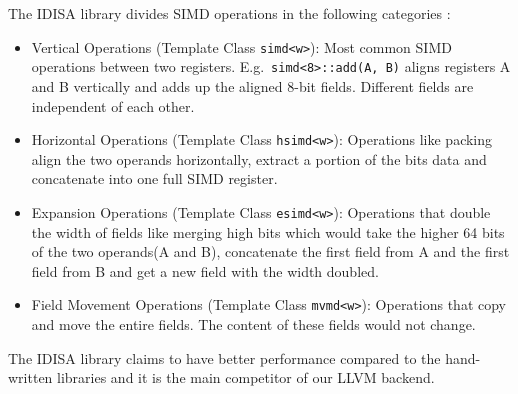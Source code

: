 The IDISA library divides SIMD operations in the following categories \cite{idisa_webpage}:
\begin{itemize}
    \item Vertical Operations (Template Class {\tt simd<w>}): Most common SIMD operations between two registers. E.g.\ {\tt simd<8>::add(A, B)} aligns registers A and B vertically and adds up the aligned 8-bit fields. Different fields are independent of each other.
    \item Horizontal Operations (Template Class {\tt hsimd<w>}): Operations like packing align the two operands horizontally, extract a portion of the bits data and concatenate into one full SIMD register.
    \item Expansion Operations (Template Class {\tt esimd<w>}): Operations that double the width of fields like merging high bits which would take the higher 64 bits of the two operands(A and B), concatenate the first field from A and the first field from B and get a new field with the width doubled.
    \item Field Movement Operations (Template Class {\tt mvmd<w>}): Operations that copy and move the entire fields. The content of these fields would not change.
\end{itemize}

The IDISA library claims to have better performance compared to the hand-written libraries and it is the main competitor of our LLVM backend.


